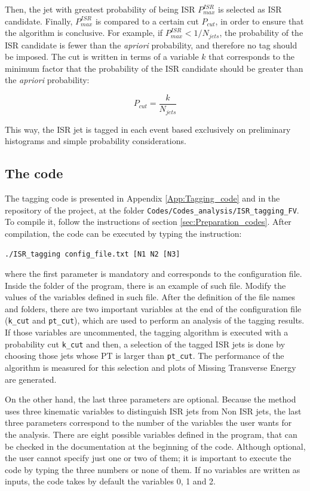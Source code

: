 \documentclass[12pt, oneside]{book}              %
\begin{document}
Then, the jet with greatest probability of being ISR $ P^{ISR}_{max} $ is selected as ISR candidate.
Finally, $ P^{ISR}_{max} $ is compared to a certain cut $ P_{cut} $, in order to ensure that the
algorithm is conclusive. For example, if $ P^{ISR}_{max} < 1/N_{jets} $, the probability of the
ISR candidate is fewer than the \textit{apriori} probability, and therefore no tag should be
imposed. The cut is written in terms of a variable $ k $ that corresponds to the minimum factor
that the probability of the ISR candidate should be greater than the \textit{apriori} probability:

\begin{equation} \label{eq:Prob_cut}
P_{cut} = \frac{k}{N_{jets}}
\end{equation}

This way, the ISR jet is tagged in each event based exclusively on preliminary histograms and 
simple probability considerations.

\subsection{The code}\label{sub:Tagging_code}

The tagging code is presented in Appendix \ref{App:Tagging_code} and in the repository 
of the project, at the folder \texttt{Codes/Codes\_analysis/ISR\_tagging\_FV}. To compile
it, follow the instructions of section \ref{sec:Preparation_codes}. After compilation,
the code can be executed by typing the instruction:

\texttt{./ISR\_tagging config\_file.txt [N1 N2 [N3]}

\noindent where the first parameter is mandatory and corresponds to the configuration 
file. Inside the folder of the program, there is an example of such file. Modify
the values of the variables defined in such file. After the definition of the file
names and folders, there are two important variables at the end of the configuration
file (\texttt{k\_cut} and \texttt{pt\_cut}), which are used to perform an
analysis of the tagging results. If those variables are uncommented, the tagging
algorithm is executed with a probability cut \texttt{k\_cut} and then, a selection
of the tagged ISR jets is done by choosing those jets whose PT is larger than
\texttt{pt\_cut}. The performance of the algorithm is measured for this selection
and plots of Missing Transverse Energy are generated.

On the other hand, the last three parameters are optional. Because the method
uses three kinematic variables to distinguish ISR jets from Non ISR jets, the 
last three parameters correspond to the number of the variables the user wants 
for the analysis. There are eight possible variables defined in the program, that can 
be checked in the documentation at the beginning of the code. Although optional, the 
user cannot specify just one or two of them; it is important to execute the code by 
typing the three numbers or none of them. If no variables are written as inputs,
the code takes by default the variables 0, 1 and 2.
\end{document}
